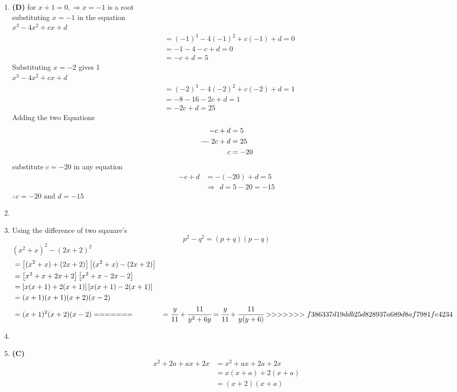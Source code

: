 \begin{multicols}{2}
\begin{enumerate}[label={\textbf{\arabic*.}}]
\item \textbf{(D)} for $x + 1 = 0,  \Rightarrow x = -1 $ is a root \\
substituting $x = -1$ in the equation \\
$x^3 -4x^2 +cx + d$
\begin{align*}
&= (-1)^3 -4(-1)^2 + c(-1) + d = 0 \\
& = -1 -4 -c + d = 0 \\
& = -c + d = 5
\end{align*}
Substituting $x = -2$ gives 1 \\
$x^3 -4x^2 +cx + d$
\begin {align*}
&= (-2)^3 -4(-2)^2 + c(-2) + d = 1 \\
& = -8 -16 -2c + d = 1 \\
& = -2c + d = 25
\end{align*}
Adding the two Equations
\begin{align*}
-c + d &= 5 \\
-\hspace{-5pt} -2c + d &= 25 \\
c &= -20
\end{align*}
substitute $c= -20$ in any equation
\begin{align*}
-c + d &= -(-20) +d = 5 \\
& \Rightarrow \hspace{5pt}   d = 5 - 20  = -15
\end{align*}
$\therefore c = -20 \text{ and } d = -15$

\item

\item Using the difference of two sqauare's \\
$$p^2 - q^2 = (p + q)(p - q)$$
$(x^2 +x)^2 - (2x + 2)^2$
\begin{align*}
&= \left[(x^2 + x) + (2x + 2)\right]\left[(x^2 +x ) - (2x + 2)\right] \\
&= \left[x^2 + x + 2x + 2\right]\left[x^2 +x  -2x - 2\right] \\
&= \left[x(x+ 1) + 2(x+ 1)\right]\left[x(x+1) -2(x+1)\right] \\
& = (x+1)(x+1)(x+2)(x-2) \\
& = (x+1)^2(x+2)(x-2)
=======
& = \cfrac{y}{11} + \cfrac{11}{y^2 + 6y} = \cfrac{y}{11} + \cfrac{11}{y(y + 6)}
>>>>>>> f386337d19ddb25d828937a689d8af7981fe4234
\end{align*}

\item
\item \textbf{(C)}
\begin{align*}
x^2 + 2a + ax + 2x &= x^2 + ax + 2a + 2x \\
&= x(x + a) + 2(x + a) \\
&= (x + 2)(x + a)
\end{align*}


\end{enumerate}
\end{multicols}
